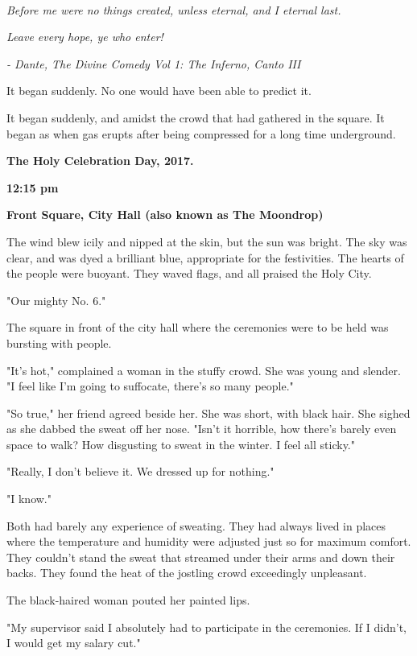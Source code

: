 \emph{\\
}

\emph{Before me were no things created, unless eternal, and I eternal
last.}

\emph{Leave every hope, ye who enter!}

\emph{- Dante, The Divine Comedy Vol 1: The Inferno, Canto III~}

It began suddenly. No one would have been able to predict it.

It began suddenly, and amidst the crowd that had gathered in the square.
It began as when gas erupts after being compressed for a long time
underground.

\textbf{The Holy Celebration Day, 2017.}

\textbf{12:15 pm}

\textbf{Front Square, City Hall (also known as The Moondrop)}

The wind blew icily and nipped at the skin, but the sun was bright. The
sky was clear, and was dyed a brilliant blue, appropriate for the
festivities. The hearts of the people were buoyant. They waved flags,
and all praised the Holy City.

"Our mighty No. 6."

The square in front of the city hall where the ceremonies were to be
held was bursting with people.

"It's hot," complained a woman in the stuffy crowd. She was young and
slender. "I feel like I'm going to suffocate, there's so many people."

"So true," her friend agreed beside her. She was short, with black hair.
She sighed as she dabbed the sweat off her nose. "Isn't it horrible, how
there's barely even space to walk? How disgusting to sweat in the
winter. I feel all sticky."

"Really, I don't believe it. We dressed up for nothing."

"I know."

Both had barely any experience of sweating. They had always lived in
places where the temperature and humidity were adjusted just so for
maximum comfort. They couldn't stand the sweat that streamed under their
arms and down their backs. They found the heat of the jostling crowd
exceedingly unpleasant.

The black-haired woman pouted her painted lips.

"My supervisor said I absolutely had to participate in the ceremonies.
If I didn't, I would get my salary cut."

